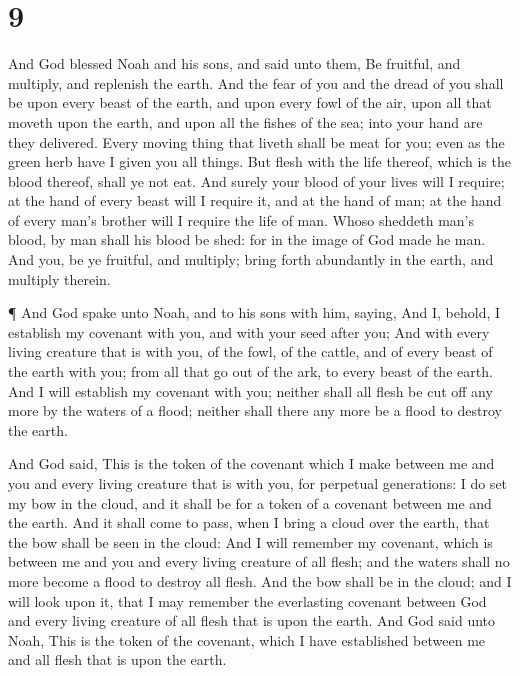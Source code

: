 \hypertarget{section-8}{%
\section{9}\label{section-8}}

 And God blessed Noah and his sons, and said unto them, Be
fruitful, and multiply, and replenish the earth.  And the
fear of you and the dread of you shall be upon every beast of the earth,
and upon every fowl of the air, upon all that moveth upon the earth, and
upon all the fishes of the sea; into your hand are they delivered.
 Every moving thing that liveth shall be meat for you; even
as the green herb have I given you all things.  But flesh
with the life thereof, which is the blood thereof, shall ye not eat.
 And surely your blood of your lives will I require; at the
hand of every beast will I require it, and at the hand of man; at the
hand of every man's brother will I require the life of man. 
Whoso sheddeth man's blood, by man shall his blood be shed: for in the
image of God made he man.  And you, be ye fruitful, and
multiply; bring forth abundantly in the earth, and multiply therein.

 ¶ And God spake unto Noah, and to his sons with him,
saying,  And I, behold, I establish my covenant with you,
and with your seed after you;  And with every living
creature that is with you, of the fowl, of the cattle, and of every
beast of the earth with you; from all that go out of the ark, to every
beast of the earth.  And I will establish my covenant with
you; neither shall all flesh be cut off any more by the waters of a
flood; neither shall there any more be a flood to destroy the earth.

 And God said, This is the token of the covenant which I
make between me and you and every living creature that is with you, for
perpetual generations:  I do set my bow in the cloud, and
it shall be for a token of a covenant between me and the earth.
 And it shall come to pass, when I bring a cloud over the
earth, that the bow shall be seen in the cloud:  And I will
remember my covenant, which is between me and you and every living
creature of all flesh; and the waters shall no more become a flood to
destroy all flesh.  And the bow shall be in the cloud; and
I will look upon it, that I may remember the everlasting covenant
between God and every living creature of all flesh that is upon the
earth.  And God said unto Noah, This is the token of the
covenant, which I have established between me and all flesh that is upon
the earth.

